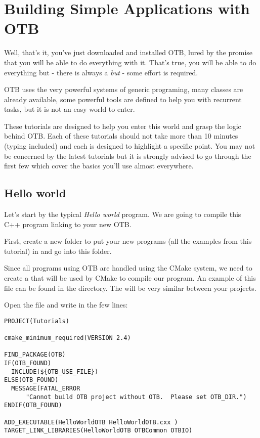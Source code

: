 \chapter{Building Simple Applications with OTB}
\label{chap:Tutorials}

Well, that's it, you've just downloaded and installed OTB, lured by the promise
that you will be able to do everything with it. That's true, you will be able
to do everything but - there is always a {\em but} - some effort is required.

OTB uses the very powerful systems of generic programing, many classes are
already available, some powerful tools are defined to help you with recurrent
tasks, but it is not an easy world to enter.

These tutorials are designed to help you enter this world and grasp the logic
behind OTB. Each of these tutorials should not take more than 10 minutes (typing
included) and each is designed to highlight a specific point. You may not be
concerned by the latest tutorials but it is strongly advised to go through the
first few which cover the basics you'll use almost everywhere.


\section{Hello world}
\label{sec:TutorialHelloWorld}


Let's start by the typical {\em Hello world} program. We are going to compile
this C++ program linking to your new OTB.

First, create a new folder to put your new programs (all the examples from this
tutorial) in and go into this folder.

Since all programs using OTB are handled using the CMake system, we need to create a
 that will be used by CMake to compile our program. An
example of this file can be found in the 
directory. The  will be very similar between your projects.

Open the  file and write in the few lines:


\begin{small}
\begin{verbatim}
PROJECT(Tutorials)

cmake_minimum_required(VERSION 2.4)

FIND_PACKAGE(OTB)
IF(OTB_FOUND)
  INCLUDE(${OTB_USE_FILE})
ELSE(OTB_FOUND)
  MESSAGE(FATAL_ERROR
      "Cannot build OTB project without OTB.  Please set OTB_DIR.")
ENDIF(OTB_FOUND)

ADD_EXECUTABLE(HelloWorldOTB HelloWorldOTB.cxx )
TARGET_LINK_LIBRARIES(HelloWorldOTB OTBCommon OTBIO)
\end{verbatim}
\end{small}


